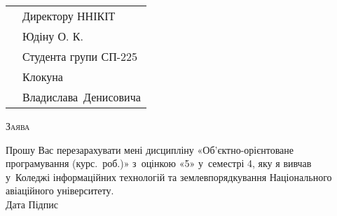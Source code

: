 \documentclass[a4paper,oneside,DIV=9,12pt]{scrartcl}
\begin{document}
	\pagestyle{empty}
%		
	
	\begin{tabular}{p{228pt}l}
		& Директору ННІКІТ\\
		& Юдіну О. К.\\
		& Студента групи СП-225\\
		& Клокуна\\
		& Владислава~Денисовича\\
	\end{tabular}
	
	\begin{center}
	\textsc{Заява}
	\end{center}
	
	Прошу Вас перезарахувати мені дисципліну «Об'єктно-орієнтоване програмування (курс.\ роб.)» з~оцінкою «5» у~семестрі 4, яку я вивчав у~Коледжі інформаційних технологій та землевпорядкування Національного авіаційного університету.\\[\baselineskip]
	
	\noindent Дата \hspace{\fill} Підпис
	
\end{document}
